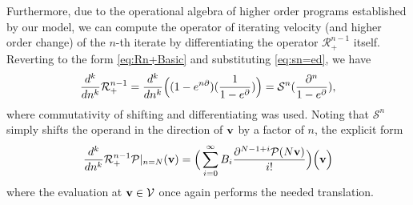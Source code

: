 Furthermore, due to the operational algebra of higher order programs established by our model, we can compute the operator of iterating velocity (and higher order change) of the $n$-th iterate by differentiating the operator $\mathcal{R}^{n-1}_+$ itself. Reverting to the form \eqref{eq:Rn+Basic} and substituting \eqref{eq:sn=ed}, we have
\begin{equation}
  \frac{d^k}{dn^k}\mathcal{R}^{n-1}_+=\frac{d^k}{dn^k}\Big((1-e^{n\partial})(\frac{1}{1-e^\partial})\Big)=\mathcal{S}^n(\frac{\partial^n}{1-e^\partial}),
   \end{equation}
where commutativity of shifting and differentiating was used. Noting that $\mathcal{S}^n$ simply shifts the operand in the direction of $\mathbf{v}$ by a factor of $n$, the explicit form 
\begin{equation}
        \frac{d^k}{dn^k}\mathcal{R}^{n-1}_+\mathcal{P}\vert_{n=N}(\mathbf{v})=\Big(\sum\limits_{i=0}^{\infty}B_i\frac{\partial^{N-1+i}\mathcal{P}(N\mathbf{v})}{i!}\Big)\Big(\mathbf{v}\Big)
        \end{equation}
where the evaluation at $\mathbf{v}\in \mathcal{V}$ once again performs the needed translation.

